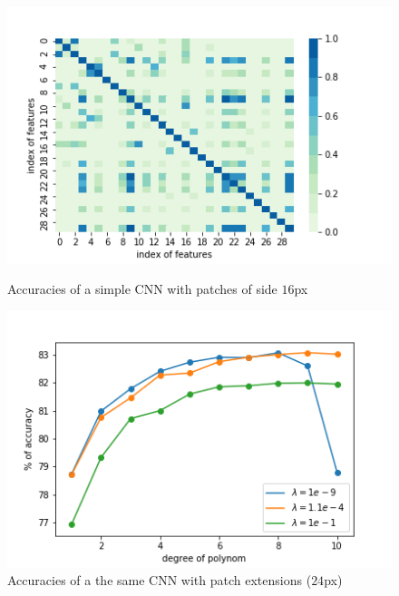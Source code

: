 \documentclass[10pt,conference,compsocconf]{IEEEtran}
\begin{document}
\begin{figure}[h]
	\centering
	\begin{minipage}[b]{0.48\linewidth}
		\includegraphics[width=\textwidth]{correlation.png}
		\captionsetup{aboveskip=0.4cm,justification=centering, margin=0.1cm, labelfont=footnotesize, textfont=footnotesize}
		\caption{Accuracies of a simple CNN with patches of side $16$px}
		\label{fig:noExtensions}
	\end{minipage}
	\hspace{0.05cm}
	\begin{minipage}[b]{0.48\linewidth}
		\includegraphics[width=\textwidth]{grid_search.png}
		\captionsetup{aboveskip=0.1cm,justification=centering, margin=0.1cm, labelfont=footnotesize, textfont=footnotesize}
		\caption{Accuracies of a the same CNN with patch extensions ($24$px)}
		\label{fig:extensions}
	\end{minipage}
\end{figure}
\end{document}
